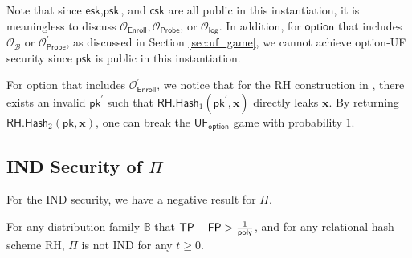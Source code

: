 Note that since $\textsf{esk}, \textsf{psk}$, and $ \textsf{csk}$ are all public in this instantiation, it is meaningless to discuss $\mathcal{O}_\textsf{Enroll}, \mathcal{O}_\textsf{Probe}$, or $\mathcal{O}_\textsf{log}$. In addition, for $\textsf{option}$ that includes $\mathcal{O}_\mathcal{B}$ or $\mathcal{O}_\textsf{Probe}^\prime$, as discussed in Section \ref{sec:uf_game}, we cannot achieve \textsf{option}-UF security since $\textsf{psk}$ is public in this instantiation.

For \textsf{option} that includes $\mathcal{O}_\textsf{Enroll}^\prime$, we notice that for the \textsf{RH} construction in \cite{cryptoeprint:2014/394}, there exists an invalid $\textsf{pk}^\prime$ such that $\textsf{RH.Hash}_1(\textsf{pk}^\prime, \mathbf{x})$ directly leaks $\mathbf{x}$. By returning $\textsf{RH.Hash}_2( \textsf{pk}, \mathbf{x} )$, one can break the $\textsf{UF}_{\textsf{option}}$ game with probability $1$.



\subsection{IND Security of $\Pi$}
\label{sec:security_analysis:rh:IND}

For the IND security, we have a negative result for $\Pi$.

\begin{theorem}

For any distribution family $\mathbb{B}$ that $\textsf{TP} - \textsf{FP} > \frac{1}{\mathsf{poly}}$, and for any relational hash scheme \textsf{RH}, $\Pi$ is not IND for any $t \geq 0$.

\end{theorem}

